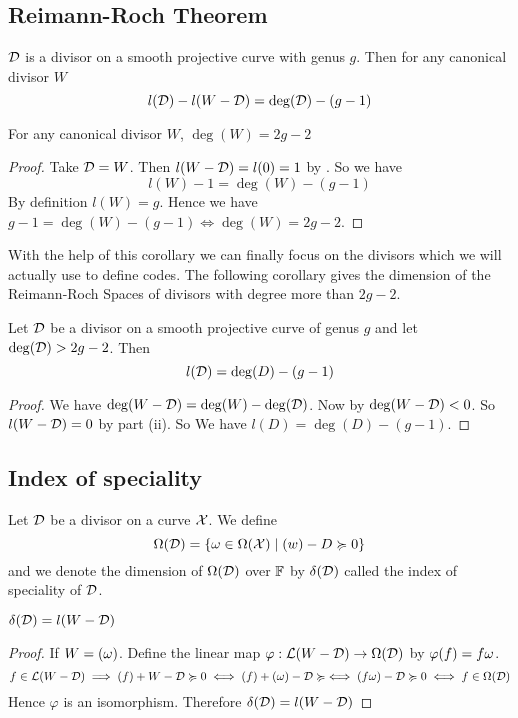 \subsection{Reimann-Roch Theorem}

\begin{theorem}
	$\mathcal{D}$ is a divisor on a smooth projective curve with genus $g$. Then for any canonical divisor $W$ $$l(\mathcal{D}) - l(W-\mathcal{D})= \deg(\mathcal{D})- (g-1)$$
\end{theorem}
\begin{corollary}\label{candivdeg}
	For any canonical divisor $W$,  $\deg(W)=2g-2$
\end{corollary}
\begin{proof}
	Take $\mathcal{D}=W$. Then $l(W-\mathcal{D})=l(0)=1$ by . So we have $$l(W)-1=\deg(W)-(g-1)$$ By definition $l(W)=g$. Hence we have $g-1=\deg(W)-(g-1)\iff \deg(W)=2g-2$.
\end{proof}
With the help of this corollary we can finally focus on the divisors which we will actually use to define codes. The following corollary gives the dimension of the Reimann-Roch Spaces of divisors with degree more than $2g-2$.
\begin{corollary}\label{divdimdeg}
	Let $\mathcal{D}$ be a divisor on a smooth projective curve of genus $g$ and let $\deg(\mathcal{D})>2g-2$. Then $$l(\mathcal{D})=\deg(D)-(g-1)$$
\end{corollary}
\begin{proof}
	We have $\deg(W-\mathcal{D})=\deg(W)-\deg(\mathcal{D})$. Now by  $\deg(W-\mathcal{D})<0$. So  $l(W-\mathcal{D})=0$ by  part (ii). So We have $l(D)=\deg(D)-(g-1)$.
\end{proof}
\subsection{Index of speciality}
\begin{definition}
	Let $\mathcal{D}$ be a divisor on a curve $\mathcal{X}$. We define $$\Omega(\mathcal{D})=\{\omega\in \Omega(\mathcal{X})\mid (w)-D\succcurlyeq 0\}$$ and we denote the dimension of $\Omega(\mathcal{D})$ over $\mathbb{F}$ by $\delta(\mathcal{D})$ called the index of speciality of $\mathcal{D}$.
\end{definition}
\begin{theorem}
	$\delta(\mathcal{D})=l(W-\mathcal{D})$
\end{theorem}
\begin{proof}
	If $W=(\omega)$. Define the linear map $\varphi:\mathcal{L}(W-\mathcal{D})\to \Omega(\mathcal{D})$ by $\varphi(f)=f\omega$. $$f\in \mathcal{L}(W-\mathcal{D})\implies (f)+W-\mathcal{D}\succcurlyeq 0 \iff (f)+(\omega)-\mathcal{D}\succcurlyeq \iff (f\omega)-\mathcal{D}\succcurlyeq0\iff f\in \Omega(\mathcal{D})$$Hence $\varphi$ is an isomorphism. Therefore $\delta(\mathcal{D})=l(W-\mathcal{D})$
\end{proof}